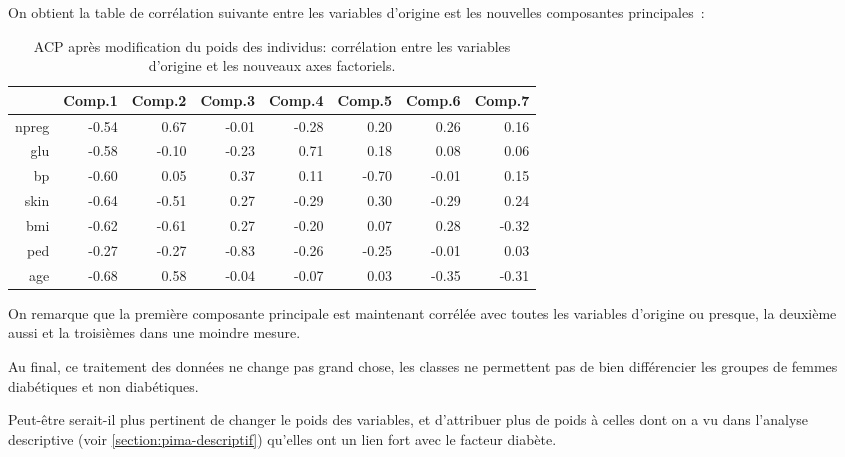 \documentclass[a4paper,10pt]{report}
\begin{document}
On obtient la table de corrélation suivante entre les variables d'origine est les nouvelles composantes principales~:

\begin{table}[H]
	\centering
	\captionsetup{justification=centering, margin=2cm}
	\caption{ACP après modification du poids des individus: corrélation entre les variables d'origine et les nouveaux axes factoriels.}
	\begin{tabular}{r|rrrrrrr}
		& Comp.1 & Comp.2 & Comp.3 & Comp.4 & Comp.5 & Comp.6 & Comp.7 \\ 
		\hline
		npreg & -0.54 & 0.67 & -0.01 & -0.28 & 0.20 & 0.26 & 0.16 \\ 
		glu & -0.58 & -0.10 & -0.23 & 0.71 & 0.18 & 0.08 & 0.06 \\ 
		bp & -0.60 & 0.05 & 0.37 & 0.11 & -0.70 & -0.01 & 0.15 \\ 
		skin & -0.64 & -0.51 & 0.27 & -0.29 & 0.30 & -0.29 & 0.24 \\ 
		bmi & -0.62 & -0.61 & 0.27 & -0.20 & 0.07 & 0.28 & -0.32 \\ 
		ped & -0.27 & -0.27 & -0.83 & -0.26 & -0.25 & -0.01 & 0.03 \\ 
		age & -0.68 & 0.58 & -0.04 & -0.07 & 0.03 & -0.35 & -0.31 \\ 
	\end{tabular}
\end{table}

On remarque que la première composante principale est maintenant corrélée avec toutes les variables d'origine ou presque, la deuxième aussi et la troisièmes dans une moindre mesure.

Au final, ce traitement des données ne change pas grand chose, les classes ne permettent pas de bien différencier les groupes de femmes diabétiques et non diabétiques.


Peut-être serait-il plus pertinent de changer le poids des variables, et d'attribuer plus de poids à celles dont on a vu dans l'analyse descriptive (voir \autoref{section:pima-descriptif}) qu'elles ont un lien fort avec le facteur diabète.
\end{document}
